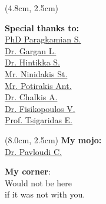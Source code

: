 \documentclass{beamer}
\begin{document}
\begin{darkframes}
\begin{frame}


      \begin{textblock*}{4.0cm}(4.8cm, 2.5cm)

         \footnotesize \textbf{Special thanks to:} \\

         \footnotesize \href{https://imbbc.hcmr.gr/user/s-paragkamian/}{PhD Paragkamian S.} \\
         \footnotesize \href{https://sites.google.com/view/lab-area52/home/meet-the-team?authuser=0}{Dr. Gargan L.} \\
         \footnotesize \href{https://www.researchgate.net/profile/Sanni-Hintikka}{Dr. Hintikka S.} \\
         \footnotesize \href{https://imbbc.hcmr.gr/user/sninidakis/}{Mr. Ninidakis St.} \\
         \footnotesize \href{https://imbbc.hcmr.gr/user/potant/}{Mr. Potirakis Ant.} \\
         \footnotesize \href{https://tolischal.github.io/}{Dr. Chalkis A.} \\
         \footnotesize \href{https://vissarion.github.io/}{Dr. Fisikopoulos V.} \\ 
         \footnotesize \href{https://who.paris.inria.fr/Elias.Tsigaridas/}{Prof. Tsigaridas E.} \\
         
      \end{textblock*}

      \begin{textblock*}{4.0cm}(8.0cm, 2.5cm)
         \footnotesize
         \textbf{My mojo:}\\
         \footnotesize 
         \href{https://cpavloud.github.io/mysite/projects/}{Dr. Pavloudi C.} \\ 

         \bigskip 

         \textbf{My corner}: \\

            Would not be here \\
            if it was not with you.
         
      \end{textblock*}



\end{frame}
\end{darkframes}
\end{document}

